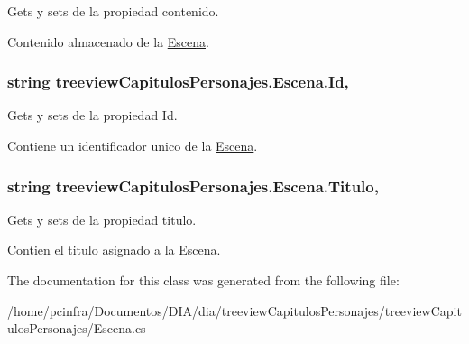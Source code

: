Gets y sets de la propiedad contenido. 

Contenido almacenado de la \hyperlink{classtreeview_capitulos_personajes_1_1_escena}{Escena}. \hypertarget{classtreeview_capitulos_personajes_1_1_escena_a771cb009292f3a39a10fbb565cb707e4}{
\subsubsection[{Id}]{\setlength{\rightskip}{0pt plus 5cm}string treeview\-Capitulos\-Personajes.\-Escena.\-Id\hspace{0.3cm}{\ttfamily [get]}, {\ttfamily [set]}}}\label{classtreeview_capitulos_personajes_1_1_escena_a771cb009292f3a39a10fbb565cb707e4}


Gets y sets de la propiedad Id. 

Contiene un identificador unico de la \hyperlink{classtreeview_capitulos_personajes_1_1_escena}{Escena}. \hypertarget{classtreeview_capitulos_personajes_1_1_escena_aae0e9d7d395983e1250022dba16a4541}{
\subsubsection[{Titulo}]{\setlength{\rightskip}{0pt plus 5cm}string treeview\-Capitulos\-Personajes.\-Escena.\-Titulo\hspace{0.3cm}{\ttfamily [get]}, {\ttfamily [set]}}}\label{classtreeview_capitulos_personajes_1_1_escena_aae0e9d7d395983e1250022dba16a4541}


Gets y sets de la propiedad titulo. 

Contien el titulo asignado a la \hyperlink{classtreeview_capitulos_personajes_1_1_escena}{Escena}. 

The documentation for this class was generated from the following file\-:\begin{DoxyCompactItemize}
\item 
/home/pcinfra/\-Documentos/\-D\-I\-A/dia/treeview\-Capitulos\-Personajes/treeview\-Capitulos\-Personajes/Escena.\-cs\end{DoxyCompactItemize}
